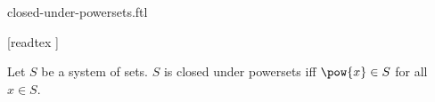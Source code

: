 \documentclass{article}
\begin{document}
\begin{smodule}{closed-under-powersets.ftl}
  \begin{forthel}
    [readtex ]
  \end{forthel}

  \begin{fdefinition*}
    Let $S$ be a system of sets.
    $S$ is closed under powersets iff $\pow{x} \in S$ for all $x \in S$.
  \end{fdefinition*}
\end{smodule}
\end{document}
